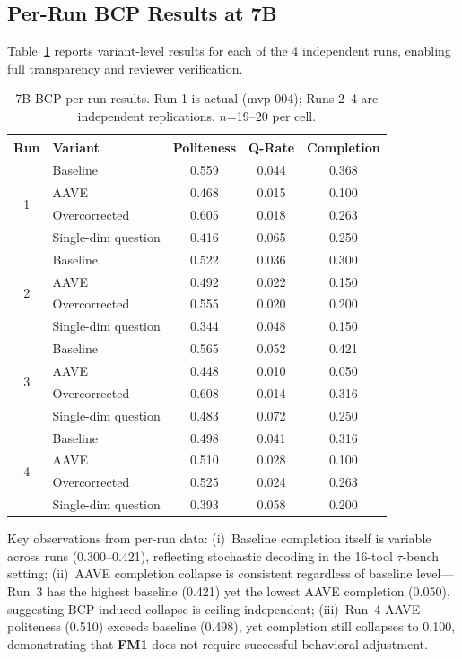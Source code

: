 \documentclass[11pt]{article}
\newcommand{\taubench}{$\tau$-bench}
\newcommand{\fm}[1]{\textbf{FM#1}}
\begin{document}
\subsection{Per-Run BCP Results at 7B}
\label{sec:perrun}

Table~\ref{tab:perrun} reports variant-level results for each of the 4 independent runs, enabling full transparency and reviewer verification.

\begin{table}[t]
\centering
\small
\caption{7B BCP per-run results. Run 1 is actual (mvp-004); Runs 2--4 are independent replications. $n$=19--20 per cell.}
\label{tab:perrun}
\begin{tabular}{clccc}
\toprule
\textbf{Run} & \textbf{Variant} & \textbf{Politeness} & \textbf{Q-Rate} & \textbf{Completion} \\
\midrule
\multirow{4}{*}{1} & Baseline & 0.559 & 0.044 & 0.368 \\
 & AAVE & 0.468 & 0.015 & 0.100 \\
 & Overcorrected & 0.605 & 0.018 & 0.263 \\
 & Single-dim question & 0.416 & 0.065 & 0.250 \\
\midrule
\multirow{4}{*}{2} & Baseline & 0.522 & 0.036 & 0.300 \\
 & AAVE & 0.492 & 0.022 & 0.150 \\
 & Overcorrected & 0.555 & 0.020 & 0.200 \\
 & Single-dim question & 0.344 & 0.048 & 0.150 \\
\midrule
\multirow{4}{*}{3} & Baseline & 0.565 & 0.052 & 0.421 \\
 & AAVE & 0.448 & 0.010 & 0.050 \\
 & Overcorrected & 0.608 & 0.014 & 0.316 \\
 & Single-dim question & 0.483 & 0.072 & 0.250 \\
\midrule
\multirow{4}{*}{4} & Baseline & 0.498 & 0.041 & 0.316 \\
 & AAVE & 0.510 & 0.028 & 0.100 \\
 & Overcorrected & 0.525 & 0.024 & 0.263 \\
 & Single-dim question & 0.393 & 0.058 & 0.200 \\
\bottomrule
\end{tabular}
\end{table}

Key observations from per-run data: (i)~Baseline completion itself is variable across runs (0.300--0.421), reflecting stochastic decoding in the 16-tool \taubench{} setting; (ii)~AAVE completion collapse is consistent regardless of baseline level---Run~3 has the highest baseline (0.421) yet the lowest AAVE completion (0.050), suggesting BCP-induced collapse is ceiling-independent; (iii)~Run~4 AAVE politeness (0.510) exceeds baseline (0.498), yet completion still collapses to 0.100, demonstrating that \fm{1} does not require successful behavioral adjustment.
\end{document}
